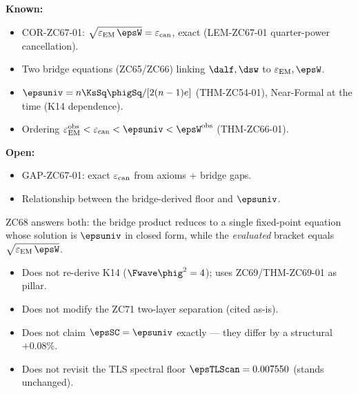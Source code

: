 \documentclass[12pt, a4paper]{article}
\renewcommand{\epsEM}{\varepsilon_{\rm EM}}
\renewcommand{\epscan}{\varepsilon_{\rm can}}
\begin{document}
\begin{keybox}[title={Pre-ZC68 Status of the Floor Hierarchy}]
\textbf{Known:}
\begin{itemize}[leftmargin=2em, noitemsep]
  \item COR-ZC67-01: $\sqrt{\epsEM\,\epsW}=\epscan$, exact
    (LEM-ZC67-01 quarter-power cancellation).
  \item Two bridge equations (ZC65/ZC66) linking $\dalf,\dsw$ to
    $\epsEM,\epsW$.
  \item $\epsuniv = n\KsSq\phigSq/[2(n-1)e]$ (THM-ZC54-01),
    Near-Formal at the time (K14 dependence).
  \item Ordering $\epsEM^{\rm obs}<\epscan<\epsuniv<\epsW^{\rm obs}$
    (THM-ZC66-01).
\end{itemize}

\textbf{Open:}
\begin{itemize}[leftmargin=2em, noitemsep]
  \item GAP-ZC67-01: exact $\epscan$ from axioms + bridge gaps.
  \item Relationship between the bridge-derived floor and $\epsuniv$.
\end{itemize}

ZC68 answers both: the bridge product reduces to a single fixed-point
equation whose solution is $\epsuniv$ in closed form, while the
\emph{evaluated} bracket equals $\sqrt{\epsEM\,\epsW}$.
\end{keybox}

\begin{keybox}[title={What ZC68 Does NOT Do}]
\begin{itemize}[leftmargin=2em, noitemsep]
  \item Does not re-derive K14 ($\Fwave\phig^2=4$); uses ZC69/THM-ZC69-01
    as pillar.
  \item Does not modify the ZC71 two-layer separation (cited as-is).
  \item Does not claim $\epsSC=\epsuniv$ exactly --- they differ by a
    structural $+0.08\%$.
  \item Does not revisit the TLS spectral floor $\epsTLScan=0.007550$
    (stands unchanged).
\end{itemize}
\end{keybox}
\end{document}
